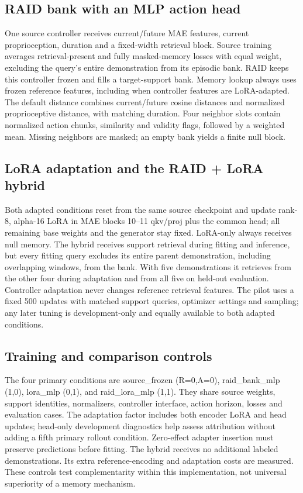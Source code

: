 \documentclass[11pt,a4paper]{article}
\begin{document}
\subsection{RAID bank with an MLP action head}

One source controller receives current/future MAE features, current proprioception, duration and a fixed-width retrieval block. Source training averages retrieval-present and fully masked-memory losses with equal weight, excluding the query's entire demonstration from its episodic bank. RAID keeps this controller frozen and fills a target-support bank. Memory lookup always uses frozen reference features, including when controller features are LoRA-adapted. The default distance combines current/future cosine distances and normalized proprioceptive distance, with matching duration. Four neighbor slots contain normalized action chunks, similarity and validity flags, followed by a weighted mean. Missing neighbors are masked; an empty bank yields a finite null block.

\subsection{LoRA adaptation and the RAID + LoRA hybrid}

Both adapted conditions reset from the same source checkpoint and update rank-8, alpha-16 LoRA in MAE blocks 10--11 qkv/proj plus the common head; all remaining base weights and the generator stay fixed. LoRA-only always receives null memory. The hybrid receives support retrieval during fitting and inference, but every fitting query excludes its entire parent demonstration, including overlapping windows, from the bank. With five demonstrations it retrieves from the other four during adaptation and from all five on held-out evaluation. Controller adaptation never changes reference retrieval features. The pilot uses a fixed 500 updates with matched support queries, optimizer settings and sampling; any later tuning is development-only and equally available to both adapted conditions.

\subsection{Training and comparison controls}

The four primary conditions are source\_frozen (R=0,A=0), raid\_bank\_mlp (1,0), lora\_mlp (0,1), and raid\_lora\_mlp (1,1). They share source weights, support identities, normalizers, controller interface, action horizon, losses and evaluation cases. The adaptation factor includes both encoder LoRA and head updates; head-only development diagnostics help assess attribution without adding a fifth primary rollout condition. Zero-effect adapter insertion must preserve predictions before fitting. The hybrid receives no additional labeled demonstrations. Its extra reference-encoding and adaptation costs are measured. These controls test complementarity within this implementation, not universal superiority of a memory mechanism.
\end{document}
